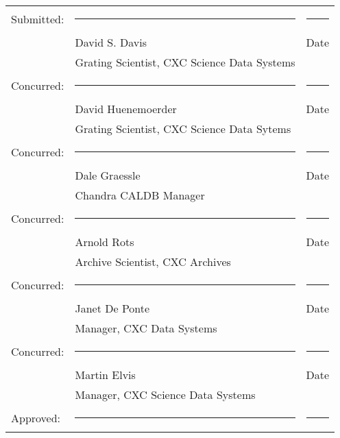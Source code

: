 \documentclass[twoside]{article}
\newenvironment{changemargin}[2]{\begin{list}{}{
         \setlength{\topsep}{0pt}\setlength{\leftmargin}{0pt}
         \setlength{\rightmargin}{0pt}
         \setlength{\listparindent}{\parindent}
         \setlength{\itemindent}{\parindent}
         \setlength{\parsep}{0pt plus 1pt}
         \addtolength{\leftmargin}{#1}\addtolength{\rightmargin}{#2}
         }\item }{\end{list}}
\begin{document}
\begin{titlepage}
\begin{changemargin}{-1in}{-1in}
  \begin{tabular}{lll}
    Submitted: & \rule{3.5in}{0.01in} & \rule{0.75in}{0.01in} \\
    & David S. Davis & Date   \\
    & Grating Scientist, CXC Science Data Systems & \\[0.25in]
    Concurred: & \rule{3.5in}{0.01in} & \rule{0.75in}{0.01in} \\
    & David Huenemoerder & Date   \\
    & Grating Scientist, CXC Science Data Sytems & \\[0.25in]
    Concurred: & \rule{3.5in}{0.01in} & \rule{0.75in}{0.01in} \\
    & Dale Graessle & Date   \\
    & Chandra CALDB Manager& \\[0.25in]
    Concurred: & \rule{3.5in}{0.01in} & \rule{0.75in}{0.01in} \\
    & Arnold Rots & Date   \\
    & Archive Scientist, CXC Archives & \\[0.25in]
    Concurred: & \rule{3.5in}{0.01in} & \rule{0.75in}{0.01in} \\
    & Janet De Ponte & Date   \\
    & Manager, CXC Data Systems & \\[0.25in]
    Concurred: & \rule{3.5in}{0.01in} & \rule{0.75in}{0.01in} \\
    & Martin Elvis & Date   \\
    & Manager, CXC Science Data Systems & \\[0.25in]
    Approved:  & \rule{3.5in}{0.01in} & \rule{0.75in}{0.01in} \\
 \end{tabular}

\end{changemargin}

\end{titlepage}


\setcounter{page}{2}

\end{document}

